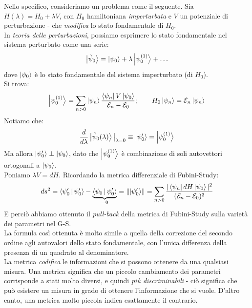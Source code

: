 \documentclass[../../InformazioneQuantistica.tex]{subfiles}
\begin{document}
Nello specifico, consideriamo un problema come il seguente. Sia $H(\lambda) = H_0 + \lambda V$, con $H_0$ hamiltoniana \textit{imperturbata} e $V$ un potenziale di perturbazione - che \textit{modifica} lo stato fondamentale di $H_0$.\\
In \textit{teoria delle perturbazioni}, possiamo esprimere lo stato fondamentale nel sistema perturbato come una serie:
\begin{align*}
\Ket{\tilde{\psi}_0} = \Ket{\psi_0} + \lambda \Ket{\psi_0^{(1)}} + \dots
\end{align*}
dove $\Ket{\psi_0}$ è lo stato fondamentale del sistema imperturbato (di $H_0$).\\
Si trova:
\begin{align*}
\Ket{\psi_0^{(1)}} = \sum_{n>0} \Ket{\psi_n}\frac{\Bra{\psi_n}V \Ket{\psi_0}}{\mathcal{E}_n-\mathcal{E}_0}; \qquad H_0 \Ket{\psi_n} = \mathcal{E}_n \Ket{\psi_n}
\end{align*}
Notiamo che:
\begin{align*}
\frac{d}{d\lambda} \Ket{\tilde{\psi}_0(\lambda)} \big|_{\lambda=0} \equiv \Ket{\psi_0'} = \Ket{\psi_0^{(1)}}
\end{align*}
Ma allora $\Ket{\psi_0'}\perp \Ket{\psi_0}$, dato che $\Ket{\psi_0^{(1)}}$ è combinazione di soli autovettori ortogonali a $\Ket{\psi_0}$.\\

Poniamo $\lambda V = dH$. Ricordando la metrica differenziale di Fubini-Study:
\begin{align*}
ds^2 = \Braket{\psi_0'|\psi_0'} - \underbrace{\Braket{\psi_0|\psi_0'}}_{=0} = \left\lVert\Ket{\psi_0'}\right\rVert = \sum_{n>0} \frac{|\Bra{\psi_n}dH\Ket{\psi_0}|^2}{(\mathcal{E}_n-\mathcal{E}_0)^2}
\end{align*}
E perciò abbiamo ottenuto il \textit{pull-back} della metrica di Fubini-Study sulla varietà dei parametri nel G-S.\\
La formula così ottenuta è molto simile a quella della correzione del secondo ordine agli autovalori dello stato fondamentale, con l'unica differenza della presenza di un quadrato al denominatore.\\

La metrica \textit{codifica} le informazioni che si possono ottenere da una qualsiasi misura. Una metrica  significa che un piccolo cambiamento dei parametri corrisponde a stati molto diversi, e quindi \textit{più discriminabili} - ciò significa che può esistere un misura in grado di ottenere l'informazione che si vuole. D'altro canto, una metrica molto piccola indica esattamente il contrario.\\
\end{document}

